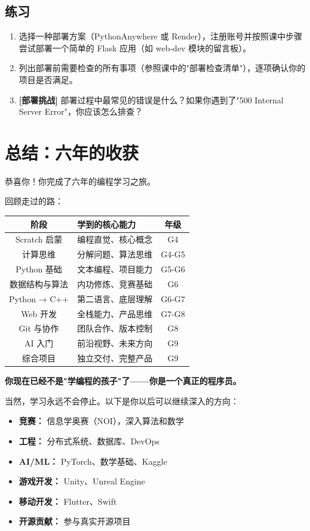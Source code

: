 \documentclass[a4paper,12pt]{ctexart}
\begin{document}
\subsection*{练习}

\begin{enumerate}
  \item 选择一种部署方案（PythonAnywhere 或 Render），注册账号并按照课中步骤尝试部署一个简单的 Flask 应用（如 web-dev 模块的留言板）。
  \item 列出部署前需要检查的所有事项（参照课中的"部署检查清单"），逐项确认你的项目是否满足。
  \item \textbf{[部署挑战]} 部署过程中最常见的错误是什么？如果你遇到了"500 Internal Server Error"，你应该怎么排查？
\end{enumerate}

\section*{总结：六年的收获}

恭喜你！你完成了六年的编程学习之旅。

回顾走过的路：

\begin{center}
\begin{tabular}{|c|l|c|}
\hline
\textbf{阶段} & \textbf{学到的核心能力} & \textbf{年级} \\ \hline
Scratch 启蒙 & 编程直觉、核心概念 & G4 \\ \hline
计算思维 & 分解问题、算法思维 & G4-G5 \\ \hline
Python 基础 & 文本编程、项目能力 & G5-G6 \\ \hline
数据结构与算法 & 内功修炼、竞赛基础 & G6 \\ \hline
Python → C++ & 第二语言、底层理解 & G6-G7 \\ \hline
Web 开发 & 全栈能力、产品思维 & G7-G8 \\ \hline
Git 与协作 & 团队合作、版本控制 & G8 \\ \hline
AI 入门 & 前沿视野、未来方向 & G9 \\ \hline
综合项目 & 独立交付、完整产品 & G9 \\ \hline
\end{tabular}
\end{center}

\textbf{你现在已经不是"学编程的孩子"了——你是一个真正的程序员。}

当然，学习永远不会停止。以下是你以后可以继续深入的方向：

\begin{itemize}
  \item \textbf{竞赛：} 信息学奥赛（NOI），深入算法和数学
  \item \textbf{工程：} 分布式系统、数据库、DevOps
  \item \textbf{AI/ML：} PyTorch、数学基础、Kaggle
  \item \textbf{游戏开发：} Unity、Unreal Engine
  \item \textbf{移动开发：} Flutter、Swift
  \item \textbf{开源贡献：} 参与真实开源项目
\end{itemize}
\end{document}
